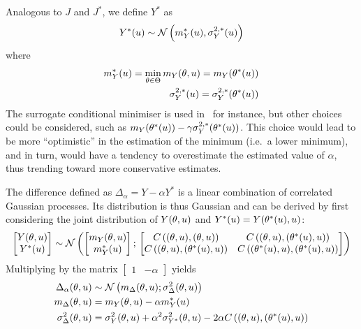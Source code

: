 \documentclass[../../Main_ManuscritThese.tex]{subfiles}
\begin{document}
Analogous to $J$ and $J^*$, we define $Y^*$ as
\begin{equation}
  Y^*(u) \sim \mathcal{N}\left(m^*_Y(u), \sigma^{2,*}_Y(u)\right)
\end{equation}
where
\begin{align}
  m^*_Y(u) = \min_{\theta\in\Theta} m_Y(\theta,u) = m_Y(\theta^*(u)) \\
  \sigma^{2,*}_Y(u) = \sigma^{2,*}_Y(\theta^*(u)) 
\end{align}
The surrogate conditional minimiser is used in~\cite{ginsbourger_bayesian_2014} for instance, but other choices could be considered, such as $m_Y(\theta^*(u)) - \gamma \sigma^{2,*}_Y(\theta^*(u))$. This choice would lead to be more ``optimistic'' in the estimation of the minimum (i.e.\ a lower minimum), and in turn, would have a tendency to overestimate the estimated value of $\alpha$, thus trending toward more conservative estimates.

The difference defined as  $\Delta_{\alpha} = Y - \alpha Y^*$ is a linear combination of correlated Gaussian processes. Its distribution is thus Gaussian and can be derived by first considering the joint distribution of $Y(\theta,u)$ and $Y^*(u) = Y(\theta^*(u), u)$:
\begin{equation}
  \begin{bmatrix}
    Y(\theta,u) \\
    Y^*(u)
  \end{bmatrix}
  \sim \mathcal{N}\left(
    \begin{bmatrix}
      m_Y(\theta,u) \\
      m_Y^*(u)
    \end{bmatrix}
    ;\,
    \begin{bmatrix}
      C\left((\theta,u),(\theta,u)\right) & C\left((\theta,u),(\theta^*(u),u)\right) \\
      C\left((\theta,u),(\theta^*(u),u)\right) & C\left((\theta^*(u),u),(\theta^*(u),u)\right)
    \end{bmatrix}
\right)
\end{equation}
Multiplying by the matrix $\begin{bmatrix}1 & -\alpha \end{bmatrix}$ yields
\begin{align}
  \Delta_{\alpha}(\theta,u) &\sim \mathcal{N}\left(m_{\Delta}(\theta,u); \sigma^2_{\Delta}(\theta,u)\right)  \label{eq:delta_GP}\\
  m_{\Delta}(\theta,u) &= m_Y(\theta,u) - \alpha m_Y^*(u) \label{eq:mu_delta_GP}\\
  \sigma^2_{\Delta}(\theta,u) &= \sigma_Y^2(\theta,u) + \alpha^2 \sigma_{Y^*}^2(\theta,u) - 2\alpha C\left((\theta,u),(\theta^*(u),u)\right) \label{eq:variance_delta_GP}
\end{align}
\end{document}

